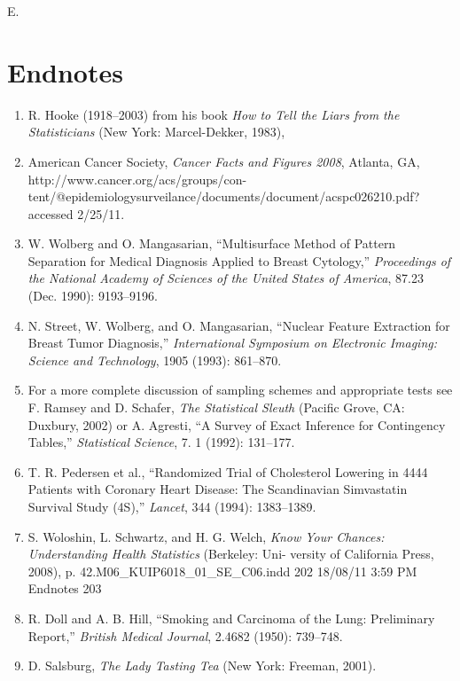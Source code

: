 \documentclass[
]{report}
\newcounter{excount}
\renewcommand{\theexcount}{E\arabic{excount}}
\begin{document}
\begin{list}{\theexcount.}{ \setlength{\itemsep}{0.5em}}
\end{list}

\hypertarget{endnotes-3}{%
\section*{Endnotes}\label{endnotes-3}}

\begin{enumerate}

\item R. Hooke (1918–2003) from his book \textit{How to Tell the Liars from the Statisticians} (New York: Marcel-Dekker, 1983),
\item American Cancer Society, \textit{Cancer Facts and Figures 2008}, Atlanta, GA, http://www.cancer.org/acs/groups/con-
tent/@epidemiologysurveilance/documents/document/acspc026210.pdf? accessed 2/25/11.
\item W. Wolberg and O. Mangasarian, “Multisurface Method of Pattern Separation for Medical Diagnosis Applied to
Breast Cytology,” \textit{Proceedings of the National Academy of Sciences of the United States of America}, 87.23 (Dec.
1990): 9193–9196.
\item N. Street, W. Wolberg, and O. Mangasarian, “Nuclear Feature Extraction for Breast Tumor Diagnosis,” \textit{International
Symposium on Electronic Imaging: Science and Technology}, 1905 (1993): 861–870.
\item For a more complete discussion of sampling schemes and appropriate tests see F. Ramsey and D. Schafer, \textit{The
Statistical Sleuth} (Pacific Grove, CA: Duxbury, 2002) or A. Agresti, “A Survey of Exact Inference for Contingency
Tables,” \textit{Statistical Science}, 7. 1 (1992): 131–177.
\item T. R. Pedersen et al., “Randomized Trial of Cholesterol Lowering in 4444 Patients with Coronary Heart Disease:
The Scandinavian Simvastatin Survival Study (4S),” \textit{Lancet}, 344 (1994): 1383–1389.
\item S. Woloshin, L. Schwartz, and H. G. Welch, \textit{Know Your Chances: Understanding Health Statistics} (Berkeley: Uni-
versity of California Press, 2008), p. 42.M06\_KUIP6018\_01\_SE\_C06.indd 202 18/08/11 3:59 PM Endnotes 203
\item R. Doll and A. B. Hill, “Smoking and Carcinoma of the Lung: Preliminary Report,” \textit{British Medical Journal}, 2.4682
(1950): 739–748.
\item D. Salsburg, \textit{The Lady Tasting Tea} (New York: Freeman, 2001).

\end{enumerate}
\end{document}
